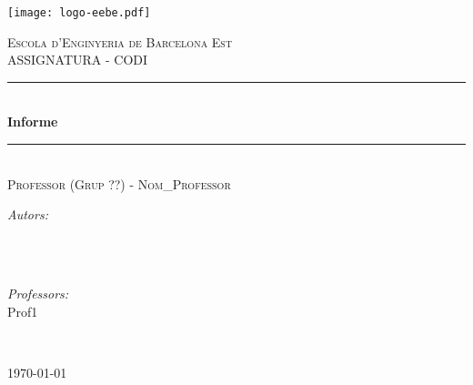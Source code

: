 \begin{titlepage}

\newcommand{\HRule}{\rule{\linewidth}{0.5mm}}

\texttt{[image: logo-eebe.pdf]}\\
\center

\textsc{\LARGE Escola d'Enginyeria de Barcelona Est}\\[1.5cm] %
\textsc{\huge ASSIGNATURA - CODI}\\[0.5cm] 

\vspace{1cm}

\makeatletter
\HRule \\[0.4cm]
{ \Huge \bfseries Informe}\\[0.2cm]
\HRule \\[2cm]

\textsc{\LARGE Professor (Grup ??) - Nom\_Professor}\\[4cm] 

\vfill

\begin{minipage}{0.4\textwidth}
\begin{flushleft} \large
\emph{Autors:}\\
\href{mailto:\mymail}{\myname} \\
\end{flushleft}
\end{minipage}
~
\begin{minipage}{0.4\textwidth}
\begin{flushright} \large
\emph{Professors:} \\
Prof1 \\
\end{flushright}
\end{minipage}\\[2cm]
\makeatother

\vfill

{\large \today}\\[2cm]

\vfill

\end{titlepage}
